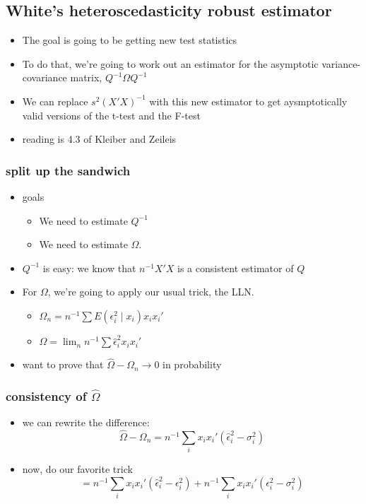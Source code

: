 \documentclass[11pt]{article}
\begin{document}
\subsection{White's heteroscedasticity robust estimator}
\label{sec-1-2}

\begin{itemize}
\item The goal is going to be getting new test statistics
\item To do that, we're going to work out an estimator for the
       asymptotic variance-covariance matrix, $Q^{-1} \Omega Q^{-1}$
\item We can replace $s^2(X'X)^{-1}$ with this new estimator to get
       aysmptotically valid versions of the t-test and the F-test
\item reading is 4.3 of Kleiber and Zeileis
\end{itemize}
\subsubsection{split up the sandwich}
\label{sec-1-2-1}

\begin{itemize}
\item goals
\begin{itemize}
\item We need to estimate $Q^{-1}$
\item We need to estimate $\Omega$.
\end{itemize}
\item $Q^{-1}$ is easy: we know that $n^{-1} X'X$ is a consistent
        estimator of $Q$
\item For $\Omega$, we're going to apply our usual trick, the LLN.
\begin{itemize}
\item $\Omega_n = n^{-1} \sum E(\epsilon_i^2 \mid x_i) x_i x_i'$
\item $\hat\Omega = \lim_n n^{-1} \sum \hat\epsilon_i^2 x_i x_i'$
\end{itemize}
\item want to prove that $\hat\Omega - \Omega_n \to 0$ in probability
\end{itemize}
\subsubsection{consistency of $\hat\Omega$}
\label{sec-1-2-2}

\begin{itemize}
\item we can rewrite the difference:
        \[\hat\Omega - \Omega_n = n^{-1} \sum_i x_i x_i'
        (\hat\epsilon_i^2 - \sigma_i^2)\]
\item now, do our favorite trick
        \[= n^{-1} \sum_i x_i x_i'(\hat\epsilon_i^2 - \epsilon_i^2) + 
        n^{-1} \sum_i x_i x_i'(\epsilon_i^2 - \sigma_i^2)\]
\end{itemize}
\end{document}
